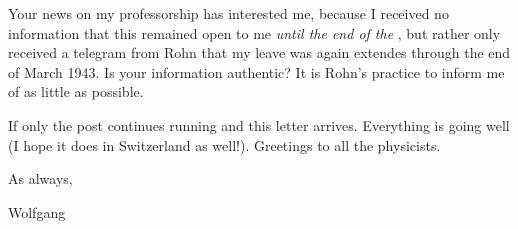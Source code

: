 Your news on my professorship has interested me, because I received no information that this remained open to me \textit{until the end of the }, but rather only received a telegram from Rohn that my leave was again extendes through the end of March 1943. Is your information authentic?  It is Rohn's practice to inform me of as little as possible. 

If only the post continues running and this letter arrives. Everything is going well (I hope it does in Switzerland as well!). Greetings to all the physicists.

As always,

Wolfgang

